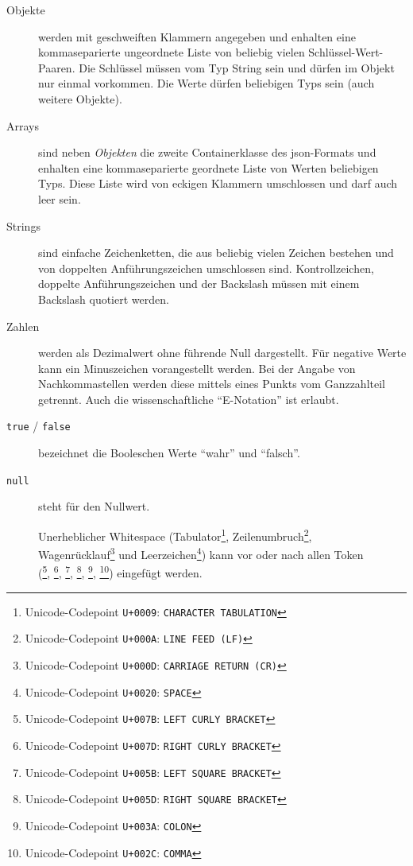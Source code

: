 \begin{description}
    \item[Objekte] werden mit geschweiften Klammern angegeben und enhalten eine kommaseparierte ungeordnete Liste von beliebig vielen Schlüssel-Wert-Paaren. Die Schlüssel müssen vom Typ String sein und dürfen im Objekt nur einmal vorkommen. Die Werte dürfen beliebigen Typs sein (auch weitere Objekte).
    \item[Arrays] sind neben \emph{Objekten} die zweite Containerklasse des \acrshort{json}-Formats und enhalten eine kommaseparierte geordnete Liste von Werten beliebigen Typs. Diese Liste wird von eckigen Klammern umschlossen und darf auch leer sein.
    \item[Strings] sind einfache Zeichenketten, die aus beliebig vielen Zeichen bestehen und von doppelten Anführungszeichen umschlossen sind. Kontrollzeichen, doppelte Anführungszeichen und der Backslash müssen mit einem Backslash quotiert werden.
    \item[Zahlen] werden als Dezimalwert ohne führende Null dargestellt. Für negative Werte kann ein Minuszeichen vorangestellt werden. Bei der Angabe von Nachkommastellen werden diese mittels eines Punkts vom Ganzzahlteil getrennt. Auch die wissenschaftliche \enquote{E-Notation} ist erlaubt.
    \item[\texttt{true} / \texttt{false}] bezeichnet die Booleschen Werte \enquote{wahr} und \enquote{falsch}.
    \item[\texttt{null}] steht für den Nullwert.
\end{description}

\begin{figure}[tp!]
\begin{definition}
\label{def:json}

Unerheblicher Whitespace (Tabulator\footnote{Unicode-Codepoint \texttt{U+0009}: \texttt{CHARACTER TABULATION}}, Zeilenumbruch\footnote{Unicode-Codepoint \texttt{U+000A}: \texttt{LINE FEED (LF)}}, Wagenrücklauf\footnote{Unicode-Codepoint \texttt{U+000D}: \texttt{CARRIAGE RETURN (CR)}} und Leerzeichen\footnote{Unicode-Codepoint \texttt{U+0020}: \texttt{SPACE}}) kann vor oder nach allen Token (\lit{\{}\footnote{Unicode-Codepoint \texttt{U+007B}: \texttt{LEFT CURLY BRACKET}}, \lit{\}}\footnote{Unicode-Codepoint \texttt{U+007D}: \texttt{RIGHT CURLY BRACKET}}, \lit{[}\footnote{Unicode-Codepoint \texttt{U+005B}: \texttt{LEFT SQUARE BRACKET}}, \lit{]}\footnote{Unicode-Codepoint \texttt{U+005D}: \texttt{RIGHT SQUARE BRACKET}}, \lit{:}\footnote{Unicode-Codepoint \texttt{U+003A}: \texttt{COLON}}, \lit{,}\footnote{Unicode-Codepoint \texttt{U+002C}: \texttt{COMMA}}) eingefügt werden.

\begin{grammar}
    
\end{grammar}
\end{definition}
\end{figure}

